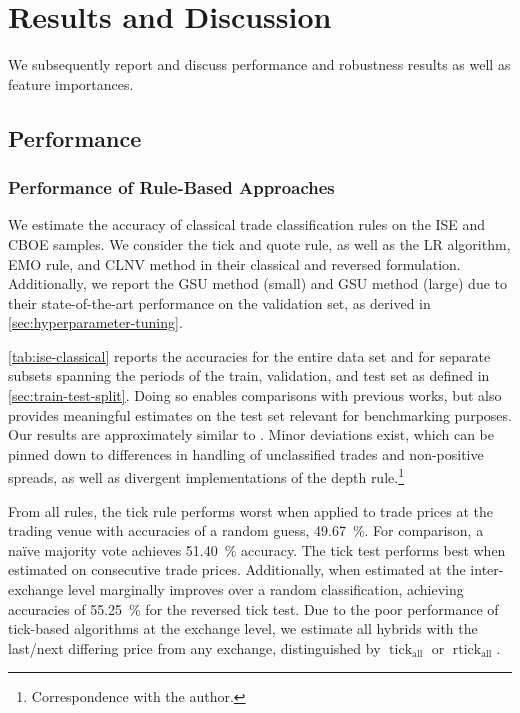 \section{Results and Discussion}\label{sec:results}

We subsequently report and discuss performance and robustness results as well as feature importances. 

\subsection{Performance}\label{sec:performance-results-discussion}


\subsubsection{Performance of Rule-Based Approaches}\label{sec:result-of-rule-based-approaches}

We estimate the accuracy of classical trade classification rules on the \gls{ISE} and \gls{CBOE} samples. We consider the tick and quote rule, as well as the \gls{LR} algorithm, \gls{EMO} rule, and \gls{CLNV} method in their classical and reversed formulation. Additionally, we report the \gls{GSU} method (small) and \gls{GSU} method (large) due to their state-of-the-art performance on the validation set, as derived in \cref{sec:hyperparameter-tuning}.

\cref{tab:ise-classical} reports the accuracies for the entire data set and for separate subsets spanning the periods of the train, validation, and test set as defined in \cref{sec:train-test-split}. Doing so enables comparisons with previous works, but also provides meaningful estimates on the test set relevant for benchmarking purposes. Our results are approximately similar to \textcite[][40--42]{grauerOptionTradeClassification2022}. Minor deviations exist, which can be pinned down to differences in handling of unclassified trades and non-positive spreads, as well as divergent implementations of the depth rule.\footnote{Correspondence with the author.}

From all rules, the tick rule performs worst when applied to trade prices at the trading venue with accuracies of a random guess, \SI{49.67}{\percent}. For comparison, a na\"ive majority vote achieves \SI{51.40}{\percent} accuracy. The tick test performs best when estimated on consecutive trade prices. Additionally, when estimated at the inter-exchange level marginally improves over a random classification, achieving accuracies of \SI{55.25}{\percent} for the reversed tick test. Due to the poor performance of tick-based algorithms at the exchange level, we estimate all hybrids with the last/next differing price from any exchange, distinguished by $\operatorname{tick}_{\mathrm{all}}$ or $\operatorname{rtick}_{\mathrm{all}}$.


